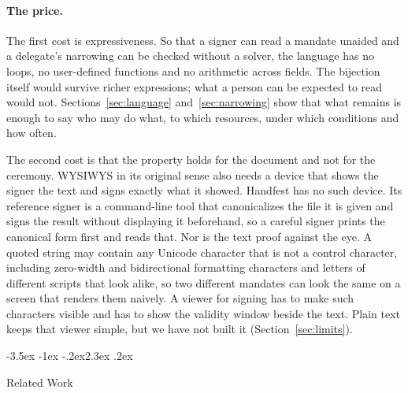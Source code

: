 \documentclass[10pt,twocolumn]{article}
\makeatletter
\theoremstyle{plain}
\theoremstyle{definition}
\renewcommand\section{\@startsection{section}{1}{\z@}%
  {-3.5ex \@plus -1ex \@minus -.2ex}{2.3ex \@plus .2ex}%
  {\normalfont\Large\bfseries\raggedright}}
\makeatother
\begin{document}
\paragraph{The price.}
The first cost is expressiveness. So that a signer can read a mandate unaided and a delegate's narrowing can be checked without a solver, the language has no loops, no user-defined functions and no arithmetic across fields. The bijection itself would survive richer expressions; what a person can be expected to read would not. Sections~\ref{sec:language} and~\ref{sec:narrowing} show that what remains is enough to say who may do what, to which resources, under which conditions and how often.

The second cost is that the property holds for the document and not for the ceremony. WYSIWYS in its original sense also needs a device that shows the signer the text and signs exactly what it showed. Handfest has no such device. Its reference signer is a command-line tool that canonicalizes the file it is given and signs the result without displaying it beforehand, so a careful signer prints the canonical form first and reads that. Nor is the text proof against the eye. A quoted string may contain any Unicode character that is not a control character, including zero-width and bidirectional formatting characters and letters of different scripts that look alike, so two different mandates can look the same on a screen that renders them naively. A viewer for signing has to make such characters visible and has to show the validity window beside the text. Plain text keeps that viewer simple, but we have not built it (Section~\ref{sec:limits}).

\section{Related Work}
\label{sec:related}
\end{document}

